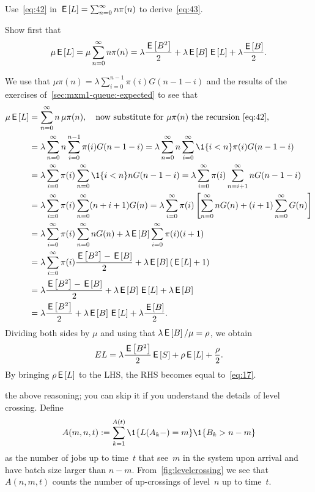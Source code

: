 \documentclass[queueing-book.tex]{subfiles}
\begin{document}
\begin{exercise}\label{ex:73}
Use~\cref{eq:42}
in $\,\mathsf{E}\left[L\right] = \sum_{n=0}^\infty n \pi(n)$ to derive~\cref{eq:43}.
\begin{hint}
  Show first that
\begin{equation*}
 \mu \,\mathsf{E}\left[L\right] =\mu \sum_{n=0}^\infty n \pi(n) = \lambda \frac{\,\mathsf{E}\left[B^2\right]}2 + \lambda \,\mathsf{E}\left[B\right] \,\mathsf{E}\left[L\right] +\lambda \frac{\,\mathsf{E}\left[B\right]}2.
\end{equation*}
\end{hint}
\begin{solution}
 We use that $\mu \pi(n) =\lambda \sum_{i=0}^{n-1} \pi(i) G(n-1-i)$ and the results of the exercises of~\cref{sec:mxm1-queue:-expected} to see that
\begin{align*}
 \mu \E \L
 &=\sum_{n=0}^\infty n\, \mu \pi(n), \quad \text{now substitute for $\mu \pi(n)$ the recursion~\cref{eq:42}}, \\
& =\lambda \sum_{n=0}^\infty n \sum_{i=0}^{n-1} \pi(i) G(n-1-i)
 =\lambda \sum_{n=0}^\infty n \sum_{i=0}^\infty \1{i<n} \pi(i) G(n-1-i) \\
& =\lambda \sum_{i=0}^\infty \pi(i) \sum_{n=0}^\infty \1{i<n} n G(n-1-i)
 =\lambda \sum_{i=0}^\infty \pi(i) \sum_{n=i+1}^\infty n G(n-1-i) \\
& =\lambda \sum_{i=0}^\infty \pi(i) \sum_{n=0}^\infty (n+i+1) G(n)
 =\lambda \sum_{i=0}^\infty \pi(i) \left[\sum_{n=0}^\infty n G(n) +(i+1) \sum_{n=0}^\infty G(n)\right] \\
 &=\lambda \sum_{i=0}^\infty \pi(i)\sum_{n=0}^\infty n G(n) +\lambda \E B \sum_{i=0}^\infty \pi(i) (i+1) \\
 &=\lambda \sum_{i=0}^\infty \pi(i) \frac{\E{B^2} -\E B}2 + \lambda \E B (\E \L +1) \\
 &= \lambda \frac{\E{B^2} -\E B}2 + \lambda \E B \E \L +\lambda \E B \\
 &= \lambda \frac{\E{B^2} }2 + \lambda \E B \E \L +\lambda \frac{\E B}2.
\end{align*}
Dividing both sides by $\mu$ and using that $\lambda \,\mathsf{E}\left[B\right]/\mu = \rho$, we obtain
\begin{equation*}
E L = \lambda \frac{\,\mathsf{E}\left[B^2\right]}2 \,\mathsf{E}\left[S\right] + \rho \,\mathsf{E}\left[L\right] + \frac\rho2.
\end{equation*}
By bringing $\rho \,\mathsf{E}\left[L\right]$ to the LHS, the RHS becomes equal to~\cref{eq:17}.
\end{solution}
\end{exercise}


 the above reasoning; you can skip it if you understand the details of level crossing.
Define
\begin{equation*}
 A(m,n,t) := \sum_{k=1}^{A(t)}\1{\L(A_k-) = m}\1{B_k > n-m}
\end{equation*}
as the number of jobs up to time~$t$ that see~$m$ in the system upon arrival and have batch size larger than $n-m$.
From~\cref{fig:levelcrossing} we see that $A(n,m,t)$ counts the number of up-crossings of level~$n$ up to time~$t$.
\end{document}
